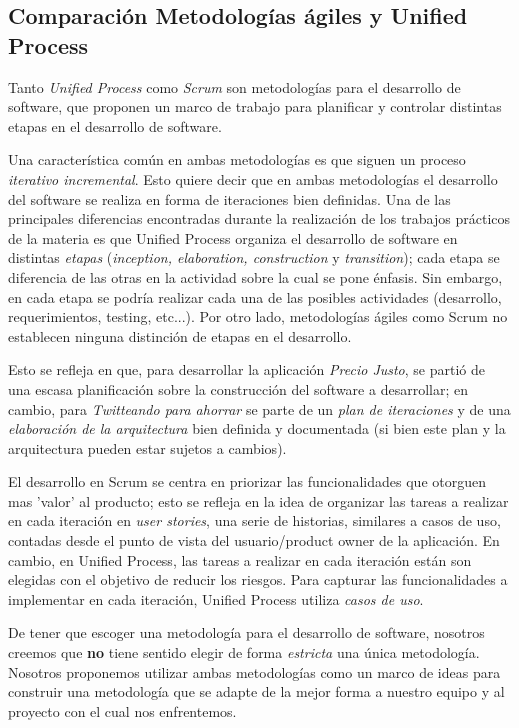 \subsection{Comparación Metodologías ágiles y Unified Process}

	Tanto \emph{Unified Process} como \emph{Scrum} son metodologías para el desarrollo de software, que proponen un marco de trabajo para planificar y controlar distintas etapas en el desarrollo de software.

	Una característica común en ambas metodologías es que siguen un proceso \emph{iterativo incremental}. Esto quiere decir que en ambas metodologías el desarrollo del software se realiza en forma de iteraciones bien definidas. Una de las principales diferencias encontradas durante la realización de los trabajos prácticos de la materia es que Unified Process organiza el desarrollo de software en distintas \emph{etapas} (\emph{inception, elaboration, construction} y \emph{transition}); cada etapa se diferencia de las otras en la actividad sobre la cual se pone énfasis. Sin embargo, en cada etapa se podría realizar cada una de las posibles actividades (desarrollo, requerimientos, testing, etc...). Por otro lado, metodologías ágiles como Scrum no establecen ninguna distinción de etapas en el desarrollo.

	Esto se refleja en que, para desarrollar la aplicación \emph{Precio Justo}, se partió de una escasa planificación sobre la construcción del software a desarrollar; en cambio, para \emph{Twitteando para ahorrar} se parte de un \emph{plan de iteraciones} y de una \emph{elaboración de la arquitectura} bien definida y documentada (si bien este plan y la arquitectura pueden estar sujetos a cambios).

	El desarrollo en Scrum se centra en priorizar las funcionalidades que otorguen mas 'valor' al producto; esto se refleja en la idea de organizar las tareas a realizar en cada iteración en \emph{user stories}, una serie de historias, similares a casos de uso, contadas desde el punto de vista del usuario/product owner de la aplicación. En cambio, en Unified Process, las tareas a realizar en cada iteración están son elegidas con el objetivo de reducir los riesgos. Para capturar las funcionalidades a implementar en cada iteración, Unified Process utiliza \emph{casos de uso}.

	De tener que escoger una metodología para el desarrollo de software, nosotros creemos que \textbf{no} tiene sentido elegir de forma \emph{estricta} una única metodología. Nosotros proponemos utilizar ambas metodologías como un marco de ideas para construir una metodología que se adapte de la mejor forma a nuestro equipo y al proyecto con el cual nos enfrentemos.

